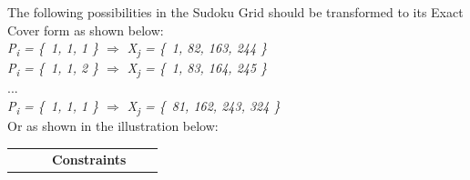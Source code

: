 \documentclass[a4paper,oneside,11pt]{report}
\begin{document}
\noindent The following possibilities in the Sudoku Grid should be transformed to its Exact Cover form as shown below:\\
{\itshape P\textsubscript{i} = \{\ 1, 1, 1 \} $\Rightarrow$ X\textsubscript{j} = \{\ 1, 82, 163, 244 \}}\\
{\itshape P\textsubscript{i} = \{\ 1, 1, 2 \} $\Rightarrow$ X\textsubscript{j} = \{\ 1, 83, 164, 245 \}}\\
...\\
{\itshape P\textsubscript{i} = \{\ 1, 1, 1 \} $\Rightarrow$ X\textsubscript{j} = \{\ 81, 162, 243, 324 \}}\\
\newline
Or as shown in the illustration below:
\begin{center}
\begin{tabular}{m{0.2cm} m{2.5cm} m{2.9cm} m{3cm} m{3cm} m{2.5cm}}
& & & \textbf{Constraints} & &
\end{tabular}
\end{center} 
\end{document}
